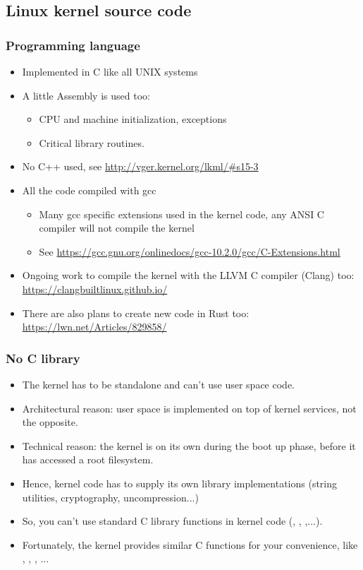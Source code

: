 \subsection{Linux kernel source code}

\begin{frame}
  \frametitle{Programming language}
  \begin{itemize}
  \item Implemented in C like all UNIX systems
  \item A little Assembly is used too:
    \begin{itemize}
    \item CPU and machine initialization, exceptions
    \item Critical library routines.
    \end{itemize}
  \item No C++ used, see \url{http://vger.kernel.org/lkml/\#s15-3}
  \item All the code compiled with gcc
    \begin{itemize}
    \item Many gcc specific extensions used in the kernel code, any
      ANSI C compiler will not compile the kernel
    \item See
      \url{https://gcc.gnu.org/onlinedocs/gcc-10.2.0/gcc/C-Extensions.html}
    \end{itemize}
    \item Ongoing work to compile the kernel with the LLVM C compiler
      (Clang) too: \url{https://clangbuiltlinux.github.io/}
    \item There are also plans to create new code in Rust too:
      \url{https://lwn.net/Articles/829858/}
  \end{itemize}
\end{frame}

\begin{frame}
  \frametitle{No C library}
  \begin{itemize}
  \item The kernel has to be standalone and can't use user space code.
  \item Architectural reason: user space is implemented on top of kernel services, not the
    opposite.
  \item Technical reason: the kernel is on its own during the boot up
    phase, before it has accessed a root filesystem.
  \item Hence, kernel code has to supply its own library implementations
    (string utilities, cryptography, uncompression...)
  \item So, you can't use standard C library functions in kernel code
    (, , ,...).
  \item Fortunately, the kernel provides similar C functions for your
    convenience, like , ,
    , ...
  \end{itemize}
\end{frame}

